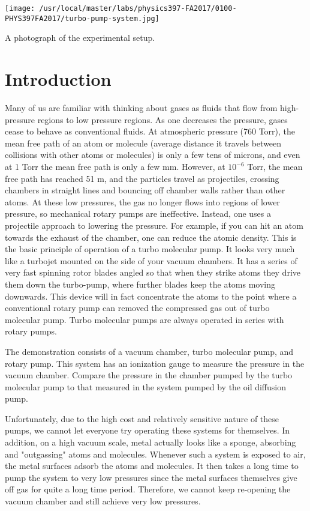 \begin{marginfigure}
\texttt{[image: /usr/local/master/labs/physics397-FA2017/0100-PHYS397FA2017/turbo-pump-system.jpg]}
\caption{A photograph of the experimental setup.}
\label{fig:VACsetup8}
\end{marginfigure}

\section{Introduction}

Many of us are familiar with thinking about gases as fluids that flow from high-pressure regions to low pressure regions. As one decreases the pressure, gases cease to behave as conventional fluids. At atmospheric pressure (760 Torr), the mean free path of an atom or molecule (average distance it travels between collisions with other atoms or molecules) is only a few tens of microns, and even at 1 Torr the mean free path is only a few mm. However, at $10^{-6}$ Torr, the mean free path has reached 51 m, and the particles travel as projectiles, crossing chambers in straight lines and bouncing off chamber walls rather than other atoms. At these low pressures, the gas no longer flows into regions of lower pressure, so mechanical rotary pumps are ineffective. Instead, one uses a projectile approach to lowering the pressure. For example, if you can hit an atom towards the exhaust of the chamber, one can reduce the atomic density.  This is the basic principle of operation of a turbo molecular pump. It looks very much like a turbojet mounted on the side of your vacuum chambers. It has a series of very fast spinning rotor blades angled so that when they strike atoms they drive them down the turbo-pump, where further blades keep the atoms moving downwards. This device will in fact concentrate the atoms to the point where a conventional rotary pump can removed the compressed gas out of turbo molecular pump. Turbo molecular pumps are always operated in series with rotary pumps.

The demonstration consists of a vacuum chamber, turbo molecular pump, and rotary pump. This system has an ionization gauge to measure the pressure in the vacuum chamber.  Compare the pressure in the chamber pumped by the turbo molecular pump to that measured in the system pumped by the oil diffusion pump. 

Unfortunately, due to the high cost and relatively sensitive nature of these pumps, we cannot let everyone try operating these systems for themselves. In addition, on a high vacuum scale, metal actually looks like a sponge, absorbing and "outgassing" atoms and molecules.  Whenever such a system is exposed to air, the metal surfaces adsorb the atoms and molecules.  It then takes a long time to pump the system to very low pressures since the metal surfaces themselves give off gas for quite a long time period. Therefore, we cannot keep re-opening the vacuum chamber and still achieve very low pressures. 



\AtEndDocument{\clearpage\ifodd\value{page}\else\null\clearpage\fi} %


